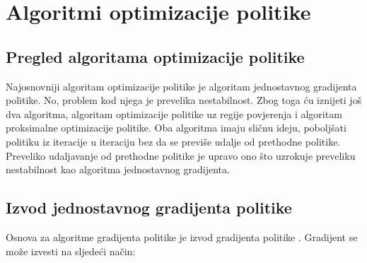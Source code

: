 \documentclass[times,utf8,diplomski]{fer}
\begin{document}

\chapter{Algoritmi optimizacije politike}

\section{Pregled algoritama optimizacije politike}

Najosnovniji algoritam optimizacije politike je algoritam jednostavnog gradijenta politike. No, problem kod njega je prevelika nestabilnost. Zbog toga ću iznijeti još dva algoritma, algoritam optimizacije politike uz regije povjerenja i algoritam proksimalne optimizacije politike. Oba algoritma imaju sličnu ideju, poboljšati politiku iz iteracije u iteraciju bez da se previše udalje od prethodne politike. Preveliko udaljavanje od prethodne politike je upravo ono što uzrokuje preveliku nestabilnost kao algoritma jednostavnog gradijenta.

\section{Izvod jednostavnog gradijenta politike}

Osnova za algoritme gradijenta politike je izvod gradijenta politike \citep{schulman}. Gradijent se može izvesti na sljedeći način:
\end{document}
